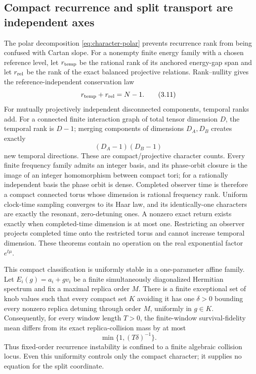 \documentclass[11pt]{article}
\theoremstyle{definition}
\theoremstyle{remark}
\begin{document}
\subsection{Compact recurrence and split transport are independent axes}

The polar decomposition \eqref{eq:character-polar} prevents recurrence
rank from being confused with Cartan slope.  For a nonempty finite energy
family with a chosen reference level, let \(r_{\rm temp}\) be the rational
rank of its anchored energy-gap span and let \(r_{\rm rel}\) be the rank of
the exact balanced projective relations.  Rank--nullity gives the
reference-independent conservation law
\[
                         r_{\rm temp}+r_{\rm rel}=N-1.
\tag{3.11}\label{eq:recurrence-rank}
\]
For mutually projectively independent disconnected components, temporal
ranks add.  For a connected finite interaction graph of total tensor
dimension \(D\), the temporal rank is \(D-1\); merging components of
dimensions \(D_A,D_B\) creates exactly
\[
                         (D_A-1)(D_B-1)
\tag{3.12}\label{eq:merge-curvature}
\]
new temporal directions.  These are compact/projective character counts.
Every finite frequency family admits an integer basis, and its phase-orbit
closure is the image of an integer homomorphism between compact tori; for a
rationally independent basis the phase orbit is dense.  Completed observer
time is therefore a compact connected torus whose dimension is rational
frequency rank.  Uniform clock-time sampling converges to its Haar law,
and its identically-one characters are exactly the resonant, zero-detuning
ones.  A nonzero exact return exists exactly when completed-time dimension
is at most one.  Restricting an observer projects completed time onto the
restricted torus and cannot increase temporal dimension.  These theorems
contain no operation on the real exponential factor \(e^{t\mu}\).

This compact classification is uniformly stable in a one-parameter affine
family.  Let \(E_i(g)=a_i+gv_i\) be a finite simultaneously diagonalized
Hermitian spectrum and fix a maximal replica order \(M\).  There is a finite
exceptional set of knob values such that every compact set \(K\) avoiding it
has one \(\delta>0\) bounding every nonzero replica detuning through order
\(M\), uniformly in \(g\in K\).  Consequently, for every window length
\(T>0\), the finite-window survival-fidelity mean differs from its exact
replica-collision mass by at most
\[
                         \min\{1,(T\delta)^{-1}\}.
\tag{3.12a}\label{eq:one-knob-uniform-collision}
\]
Thus fixed-order recurrence instability is confined to a finite algebraic
collision locus.  Even this uniformity controls only the compact character;
it supplies no equation for the split coordinate.
\end{document}
